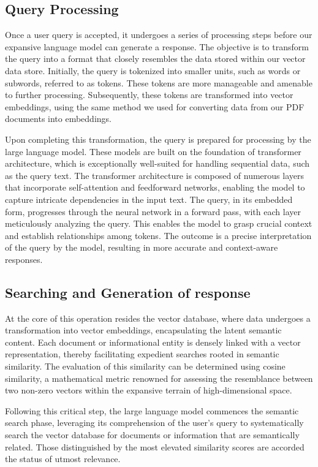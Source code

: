 \documentclass[conference]{IEEEtran}
\begin{document}
\subsection{Query Processing}
Once a user query is accepted, it undergoes a series of processing steps before our expansive language model can generate a response. The objective is to transform the query into a format that closely resembles the data stored within our vector data store. Initially, the query is tokenized into smaller units, such as words or subwords, referred to as tokens. These tokens are more manageable and amenable to further processing. Subsequently, these tokens are transformed into vector embeddings, using the same method we used for  converting data from our PDF documents into embeddings.

Upon completing this transformation, the query is prepared for processing by the large language model. These models are built on the foundation of transformer architecture, which is exceptionally well-suited for handling sequential data, such as the query text. The transformer architecture is composed of numerous layers that incorporate self-attention and feedforward networks, enabling the model to capture intricate dependencies in the input text. The query, in its embedded form, progresses through the neural network in a forward pass, with each layer meticulously analyzing the query. This enables the model to grasp crucial context and establish relationships among tokens. The outcome is a precise interpretation of the query by the model, resulting in more accurate and context-aware responses.

\subsection{Searching and Generation of response}
At the core of this operation resides the vector database, where data undergoes a transformation into vector embeddings, encapsulating the latent semantic content. Each document or informational entity is densely linked with a vector representation, thereby facilitating expedient searches rooted in semantic similarity. The evaluation of this similarity can be determined using cosine similarity, a mathematical metric renowned for assessing the resemblance between two non-zero vectors within the expansive terrain of high-dimensional space.

Following this critical step, the large language model commences the semantic search phase, leveraging its comprehension of the user's query to systematically search the vector database for documents or information that are semantically related. Those distinguished by the most elevated similarity scores are accorded the status of utmost relevance.
\end{document}
